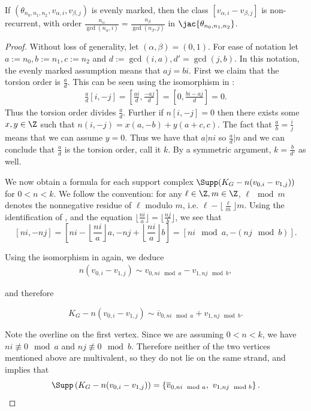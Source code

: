 \begin{lemma}
If $(\theta_{n_0,n_1,n_2},v_{\alpha,i},v_{\beta,j})$ is evenly marked, then the class $[v_{\alpha,i}-v_{\beta,j}]$ is non-recurrent, with order $\frac{n_\alpha}{\gcd(n_\alpha,i)} = \frac{n_\beta}{\gcd(n_\beta, j)}$ in $\jac{\theta_{n_0,n_1,n_2}}$.
\end{lemma}

\begin{proof}
Without loss of generality, let $(\alpha,\beta) = (0,1)$. For ease of notation let $a:= n_0, b:= n_1, c:=n_2$ and $d:= \gcd(i,a),d' = \gcd(j,b)$. In this notation, the evenly marked assumption means that $aj = bi$. First we claim that the torsion order is $\frac{a}{d}$. This can be seen using the isomorphism in :
\begin{align*}
    \frac{a}{d}[i,-j] = \left[\frac{ai }{d},\frac{-aj}{d}\right] = \left[0,\frac{bi - aj}{d}\right] = 0.
\end{align*}
Thus the torsion order divides $\frac{a}{d}$. Further if $n[i,-j] = 0$ then there exists some $x,y \in \Z$ such that $n(i,-j) = x(a,-b) + y(a+c,c)$. The fact that $\frac{a}{b} = \frac{i}{j}$ means that we can assume $y = 0$. Thus we have that $a|ni$ so $\frac{a}{d}|n$ and we can conclude that $\frac{a}{d}$ is the torsion order, call it $k$. By a symmetric argument, $k =\frac{b}{d'}$ as well.

We now obtain a formula for each support complex $\Supp(K_G - n(v_{0,i}-v_{1,j}))$ for $0<n<k$. 
We follow the convention: for any $\ell \in \Z, m \in \Z$, $\ell\mod m$ denotes the nonnegative residue of $\ell$ modulo $m$, i.e. $\ell - \lfloor \frac{\ell}{m} \rfloor m$.
Using the identification of , and the equation $\lfloor \frac{ni}{a} \rfloor = \lfloor \frac{nj}{b} \rfloor$, we see that 
$$[ni,-n j ] = \left[ni - \left\lfloor \frac{ni}{a}\right\rfloor a,-n j + \left\lfloor \frac{ni}{a} \right\rfloor b \right] = \left[ ni \mod a, - (nj \mod b )\right].$$


Using the isomorphism in  again, we deduce 
\begin{align}\label{eq:multDiffMarkedPts}
n(v_{0,i}-v_{1,j}) \sim v_{0,ni \mod a} - v_{1,nj \mod b},
\end{align}

and therefore

$$
K_G - n(v_{0,i} - v_{1,j}) \sim \overline{v}_{0, ni \mod a} + v_{1,nj \mod b}.
$$

Note the overline on the first vertex. Since we are assuming $0 < n < k$, we have $ni \not\equiv 0 \mod a$ and $nj \not\equiv 0 \mod b$. Therefore neither of the two vertices mentioned above are multivalent, so they do not lie on the same strand, and  implies that
$$\Supp \left( K_G - n(v_{0,i} - v_{1,j}) \right)
= \left\{ \overline{v}_{0, ni \mod a},\ v_{1,nj \mod b} \right\}.
$$


\end{proof}
